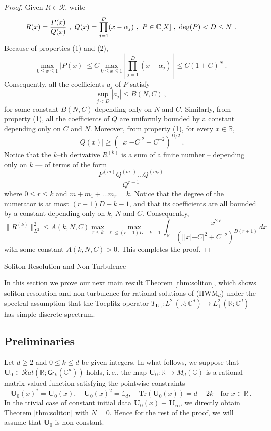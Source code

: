 \documentclass[11pt,reqno]{amsart}
\makeatletter
\theoremstyle{definition}
\theoremstyle{remark}
\theoremstyle{remark}
\numberwithin{equation}{section}
\newcommand{\C}{\mathbb{C}}
\newcommand{\R}{\mathbb{R}}
\newcommand{\Ub}{\mathbf{U}}
\newcommand{\Tr}{\mathrm{Tr}}
\newcommand{\Gr}{\mathsf{Gr}}
\def\section{\@startsection{section}{1}%
  \z@{1.5\linespacing\@plus\linespacing}{.5\linespacing}%
  {\normalfont\bfseries\large\centering}}
\makeatother
\begin{document}
\begin{proof}
Given $R\in \mathcal R$, write
$$R(x)=\frac{P(x)}{Q(x)}\ ,\ Q(x)=\prod_{j=1}^D (x-\alpha _j)\ ,\ P\in \C[X]\ ,\ {\rm deg}(P)<D\leq N\ .$$
Because of properties (1) and (2), 
$$\max_{0\leq x\leq 1} |P(x)|\leq C\max_{0\leq x\leq 1}\left |  \prod_{j=1}^D (x-\alpha _j)\ \right |\leq C(1+C)^N\ .$$
Consequently, all the coefficients $a_j$ of $P$ satisfy
$$\sup_{j<D}|a_j|\leq B(N,C)\ ,$$
for some constant $B(N,C)$ depending only on $N$ and $C$. 
Similarly, from property (1), all the coefficients of $Q$ are uniformly bounded by a constant depending only on $C$ and $N$.
Moreover, from property (1), for every $x\in \R$,
 $$|Q(x)|\geq \left ( ||x|-C|^2+C^{-2}  \right )^{D/2}\ .$$
Notice that the $k$--th derivative $R^{(k)}$ is a sum of  a finite number -- depending only on $k$ --- of terms of the form
$$\frac{ P^{(m)}Q^{(m_1)}\dots Q^{(m_r)}  }{Q^{r+1}}$$
where $ 0\leq r\leq k$ and $m+m_1+\dots m_r =k$. Notice that the degree of the numerator is at most $(r+1)D-k-1$, and that its coefficients are all bounded by a constant depending only on $k$, $N$ and $C$. Consequently,
$$\| R^{(k)}\|_{L^2}^2\leq A(k,N,C) \max _{r\leq k}\max _{\ell \leq (r+1)D-k-1}\int_\R \frac{x^{2\ell}}{( ||x|-C|^2+C^{-2} )^{D(r+1)}}\, dx $$
with some constant $A(k,N,C)>0$. This completes the proof.
\end{proof}



\section{Soliton Resolution and Non-Turbulence}

In this section we prove our next main result Theorem \ref{thm:soliton}, which shows soliton resolution and non-turbulence for rational solutions of (HWM$_d$) under the spectral assumption that the Toeplitz operator $T_{\Ub_0} : L^2_+(\R; \C^d) \to L^2_+(\R;\C^d)$ has simple discrete spectrum.


\subsection*{Preliminaries}
Let $d \geq 2$ and $0 \leq k \leq d$ be given integers. In what follows, we suppose that $\Ub_0 \in \mathcal{R}at(\R; \Gr_k(\C^d))$ holds, i.\,e., the map $\Ub_0 : \R \to M_d(\C)$ is a rational matrix-valued function satisfying the pointwise constraints
$$
\Ub_0(x)^* = \Ub_0(x), \quad \Ub_0(x)^2 = \mathds{1}_d, \quad \Tr(\Ub_0(x)) = d-2k \quad \mbox{for $x \in \R$} \, .
$$
In the trivial case of constant initial data $\Ub_0(x) \equiv \Ub_\infty$, we directly obtain Theorem \ref{thm:soliton} with $N=0$. Hence for the rest of the proof, we will assume that $\Ub_0$ is non-constant. 
\end{document}

